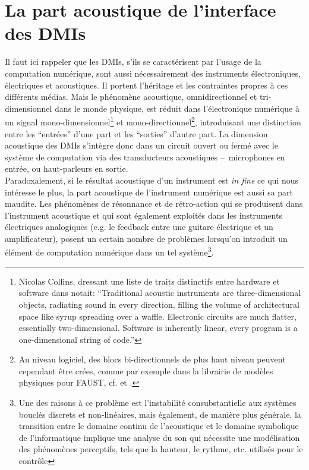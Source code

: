 \section{La part acoustique de l'interface des DMIs}
\label{sec:interfaces:part_acoustique}

\noindent Il faut ici rappeler que les \glspl{DMI}, s'ils se caractérisent par l'usage de la computation numérique, sont aussi nécessairement des instruments électroniques, électriques et acoustiques. Il portent l'héritage et les contraintes propres à ces différents médias. Mais le phénomène acoustique, omnidirectionnel et tri-dimensionnel dans le monde physique, est réduit dans l'électronique numérique à un signal mono-dimensionnel\footnote{Nicolas Collins, dressant une liste de traits distinctifs entre hardware et software dans \cite{collins_semiconducting_2013} notait: ``Traditional acoustic instruments are three-dimensional objects, radiating sound in every direction, filling the volume of architectural space like syrup spreading over a waffle. Electronic circuits are much flatter, essentially two-dimensional. Software is inherently linear, every program is a one-dimensional string of code.''} et mono-directionnel\footnote{Au niveau logiciel, des blocs bi-directionnels de plus haut niveau peuvent cependant être crées, comme par exemple dans la librairie de modèles physiques pour \gls{FAUST}, cf. \cite{berdahl_introduction_2012} et \cite{michon_faust_2018}.}, introduisant une distinction entre les ``entrées'' d'une part et les ``sorties'' d'autre part. La dimension acoustique des \glspl{DMI} s'intègre donc dans un circuit ouvert ou fermé avec le système de computation via des transducteurs acoustiques --~microphones en entrée, ou haut-parleurs en sortie.\\
\indent Paradoxalement, si le résultat acoustique d'un instrument est \textit{in fine} ce qui nous intéresse le plus, la part acoustique de l'instrument numérique est aussi sa part maudite. Les phénomènes de résonnance et de rétro-action qui se produisent dans l'instrument acoustique et qui sont également exploités dans les instruments électriques analogiques (e.g. le feedback entre une guitare électrique et un amplificateur), posent un certain nombre de problèmes lorsqu'on introduit un élément de computation numérique dans un tel système\footnote{Une des raisons à ce problème est l'instabilité consubstantielle aux systèmes bouclés discrets et non-linéaires, mais également, de manière plus générale, la transition entre le domaine continu de l'acoustique et le domaine symbolique de l'informatique implique une analyse du son qui nécessite une modélisation des phénomènes perceptifs, tels que la hauteur, le rythme, etc. utilisés pour le contrôle}.\\

